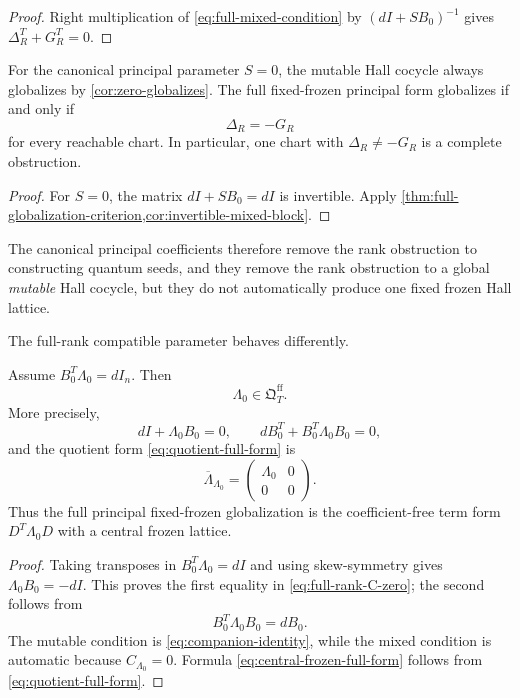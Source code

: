 \begin{proof}
Right multiplication of \cref{eq:full-mixed-condition} by
$(dI+SB_0)^{-1}$ gives
$\Delta_R^T+G_R^T=0$.
\end{proof}

\begin{corollary}
\label{cor:canonical-full-no-go}
For the canonical principal parameter $S=0$, the mutable Hall cocycle always
globalizes by \cref{cor:zero-globalizes}.  The full fixed-frozen principal
form globalizes if and only if
\[
 \Delta_R=-G_R
\]
for every reachable chart.  In particular, one chart with
$\Delta_R\ne-G_R$ is a complete obstruction.
\end{corollary}

\begin{proof}
For $S=0$, the matrix $dI+SB_0=dI$ is invertible.  Apply
\cref{thm:full-globalization-criterion,cor:invertible-mixed-block}.
\end{proof}

The canonical principal coefficients therefore remove the rank obstruction to
constructing quantum seeds, and they remove the rank obstruction to a global
\emph{mutable} Hall cocycle, but they do not automatically produce one fixed
frozen Hall lattice.

The full-rank compatible parameter behaves differently.

\begin{corollary}
\label{cor:full-rank-full-principal}
Assume $B_0^T\Lambda_0=dI_n$.  Then
\[
 \Lambda_0\in\mathfrak Q_T^{\mathrm{ff}}.
\]
More precisely,
\begin{equation}
 dI+\Lambda_0B_0=0,
 \qquad
 dB_0^T+B_0^T\Lambda_0B_0=0,
 \label{eq:full-rank-C-zero}
\end{equation}
and the quotient form \cref{eq:quotient-full-form} is
\begin{equation}
 \overline\Lambda_{\Lambda_0}
 =\begin{pmatrix}\Lambda_0&0\\0&0\end{pmatrix}.
 \label{eq:central-frozen-full-form}
\end{equation}
Thus the full principal fixed-frozen globalization is the coefficient-free
term form $D^T\Lambda_0D$ with a central frozen lattice.
\end{corollary}

\begin{proof}
Taking transposes in $B_0^T\Lambda_0=dI$ and using skew-symmetry gives
$\Lambda_0B_0=-dI$.  This proves the first equality in
\cref{eq:full-rank-C-zero}; the second follows from
\[
 B_0^T\Lambda_0B_0=dB_0.
\]
The mutable condition is \cref{eq:companion-identity}, while the mixed
condition is automatic because $C_{\Lambda_0}=0$.  Formula
\cref{eq:central-frozen-full-form} follows from
\cref{eq:quotient-full-form}.
\end{proof}

